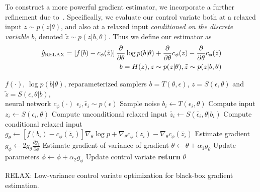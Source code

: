 \documentclass{article}
\newcommand{\PT}{\frac{\partial}{\partial \theta}}
\newcommand{\RELAX}{{\textnormal{RELAX}}}
\begin{document}
To construct a more powerful gradient estimator, we incorporate a further refinement due to~\cite{tucker2017rebar}.
Specifically, we evaluate our control variate both at a relaxed input $z \sim p(z|\theta)$, and also at a relaxed input \emph{conditioned on the discrete variable $b$}, denoted $\tilde z \sim p(z|b, \theta)$. 
Thus we define our estimator as
%
\begin{align}
\hat g_\textnormal{RELAX} = \left[ f(b) - c_\phi(\hat{z}) \right] \PT \log p(b|\theta) + \PT c_\phi(z) - \PT c_\phi (\tilde{z}) \\
\qquad b = H(z), z \sim p(z|\theta), \tilde{z} \sim p(z|b, \theta) \nonumber
\end{align}
%

\begin{algorithm}[h]
	\begin{algorithmic}
		\Require $f(\cdot)$, $\log p(b|\theta)$, reparameterized samplers $b = T(\theta, \epsilon)$, $z = S(\epsilon, \theta)$ and $\tilde{z} = S(\epsilon, \theta | b)$, \\ 
		\hspace{3em} neural network $c_\phi(\cdot)$   
		\State $\epsilon_{i}, \widetilde{\epsilon_i} \sim p(\epsilon)$ \Comment Sample noise
		\State $b_i \leftarrow T(\epsilon_i, \theta)$ \Comment Compute input
		\State $z_i \leftarrow S(\epsilon_i, \theta)$ \Comment Compute unconditional relaxed input
		\State $\widetilde{z_i} \leftarrow S(\widetilde{\epsilon_i}, \theta | b_i)$ \Comment Compute conditional relaxed input
		\State  $g_\theta \leftarrow \left[f(b_i) - c_{\phi}(\widetilde{z_i}) \right] \nabla_\theta \log p + \nabla_\theta c_\phi(z_i) - \nabla_\theta c_\phi(\widetilde{z_i})$ \Comment Estimate gradient
		\State  $g_\phi \leftarrow 2 g_\theta \frac{\partial g_\theta}{\partial \phi}$ \Comment Estimate gradient of variance of gradient
		\State $\theta \leftarrow \theta + \alpha_1 g_\theta$ \Comment Update parameters
		\State $\phi \leftarrow \phi + \alpha_2 g_\phi$ \Comment Update control variate
		\EndWhile
		\State \textbf{return} $\theta$ 
	\end{algorithmic}
	\caption{\RELAX{}: Low-variance control variate optimization for black-box gradient estimation.}
	\label{lax}
\end{algorithm}
\end{document}
